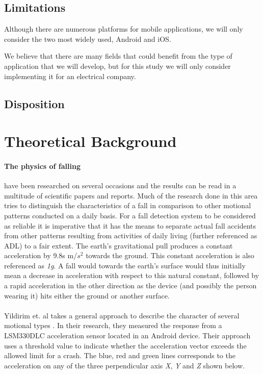 \documentclass[12pt, a4paper, onecolumn]{article}
\begin{document}
	\subsection{Limitations}
	
	Although there are numerous platforms for mobile applications, we will only consider the two most widely used, Android and iOS.
	
	We believe that there are many fields that could benefit from the type of application that we will develop, but for this study we will only consider implementing it for an electrical company.
	
	\subsection{Disposition}
	
	\newpage
	
	\section{Theoretical Background}
	
	\paragraph{The physics of falling} have been researched on several occasions and the results can be read in a multitude of scientific papers and reports. Much of the research done in this area tries to distinguish the characteristics of a fall in comparison to other motional patterns conducted on a daily basis. For a fall detection system to be considered as reliable it is imperative that it has the means to separate actual fall accidents from other patterns resulting from activities of daily living (further referenced as ADL) to a fair extent. The earth's gravitational pull produces a constant acceleration by 9.8s m/$s^{2}$ towards the ground. This constant acceleration is also referenced as \textit{1g}. A fall would towards the earth's surface would thus initially mean a decrease in acceleration with respect to this natural constant, followed by a rapid acceleration in the other direction as the device (and possibly the person wearing it) hits either the ground or another surface.
	
	
	\paragraph{} Yildirim et. al takes a general approach to describe the character of several motional types \cite{int_journ}. In their research, they measured the response from a LSM330DLC acceleration sensor located in an Android device. Their approach uses a threshold value to indicate whether the acceleration vector exceeds the allowed limit for a crash. The blue, red and green lines corresponds to the acceleration on any of the three perpendicular axis \textit{X}, \textit{Y} and \textit{Z} shown below.
	
\end{document}
